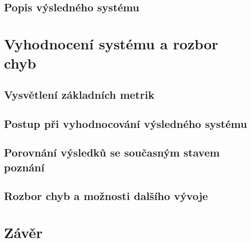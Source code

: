 \section{Popis výsledného systému}
\blindtext[8]


\chapter{Vyhodnocení systému a rozbor chyb}
\blindtext[2]
\section{Vysvětlení základních metrik}
\blindtext[4]
\section{Postup při vyhodnocování výsledného systému}
\blindtext[3]
\section{Porovnání výsledků se současným stavem poznání}
\blindtext[8]
\section{Rozbor chyb a možnosti dalšího vývoje}
\blindtext[5]



\chapter{Závěr}
\blindtext[4]

